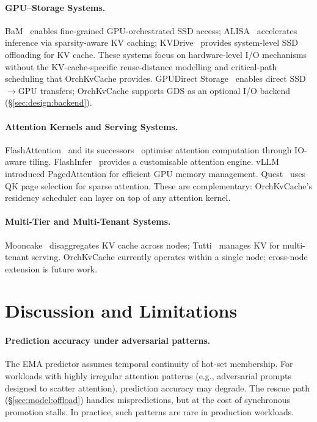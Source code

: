 \documentclass[acmsmall,nonacm,screen]{acmart}
\newcommand{\sys}{OrchKvCache}
\begin{document}
\paragraph{GPU--Storage Systems.}
BaM~\cite{qureshi2023bam} enables fine-grained GPU-orchestrated SSD access;
ALISA~\cite{zhao2024alisa} accelerates inference via sparsity-aware KV
caching; KVDrive~\cite{patel2024kvdrive} provides system-level SSD
offloading for KV cache.  These systems focus on hardware-level I/O
mechanisms without the KV-cache-specific reuse-distance modelling and
critical-path scheduling that \sys{} provides.
GPUDirect Storage~\cite{nvidia2023gds} enables direct SSD$\to$GPU
transfers; \sys{} supports GDS as an optional I/O backend
(\S\ref{sec:design:backend}).

\paragraph{Attention Kernels and Serving Systems.}
FlashAttention~\cite{dao2022flashattention} and its
successors~\cite{dao2023flashattention2, shah2024flashattention3} optimise
attention computation through IO-aware tiling.
FlashInfer~\cite{ye2024flashinfer} provides a customisable attention engine.
vLLM~\cite{kwon2023vllm} introduced PagedAttention for efficient GPU memory
management.
Quest~\cite{tang2024quest} uses QK page selection for sparse attention.
These are complementary: \sys{}'s residency scheduler can layer on top of
any attention kernel.

\paragraph{Multi-Tier and Multi-Tenant Systems.}
Mooncake~\cite{qiu2024mooncake} disaggregates KV cache across nodes;
Tutti~\cite{wu2024tutti} manages KV for multi-tenant serving.
\sys{} currently operates within a single node; cross-node extension
is future work.


\section{Discussion and Limitations}\label{sec:discussion}

\paragraph{Prediction accuracy under adversarial patterns.}
The EMA predictor assumes temporal continuity of hot-set membership.
For workloads with highly irregular attention patterns (e.g., adversarial
prompts designed to scatter attention), prediction accuracy may degrade.
The rescue path (\S\ref{sec:model:offload}) handles mispredictions, but
at the cost of synchronous promotion stalls.  In practice, such patterns
are rare in production workloads.
\end{document}
